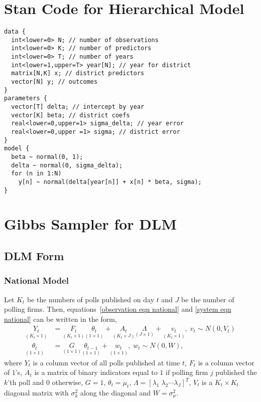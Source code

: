 \documentclass[12pt,final,fleqn]{article}
\theoremstyle{plain}
\begin{document}
\begin{appendices}
\section{Stan Code for Hierarchical Model} \label{Stan}
\begin{verbatim}
data {
  int<lower=0> N; // number of observations
  int<lower=0> K; // number of predictors
  int<lower=0> T; // number of years
  int<lower=1,upper=T> year[N]; // year for district
  matrix[N,K] x; // district predictors
  vector[N] y; // outcomes
} 
parameters {
  vector[T] delta; // intercept by year
  vector[K] beta; // district coefs
  real<lower=0,upper=1> sigma_delta; // year error
  real<lower=0,upper =1> sigma; // district error
} 
model {
  beta ~ normal(0, 1);
  delta ~ normal(0, sigma_delta);
  for (n in 1:N)
    y[n] ~ normal(delta[year[n]] + x[n] * beta, sigma);
}
\end{verbatim}

\section{Gibbs Sampler for DLM} \label{Gibbs}
\subsection{DLM Form} \label{sec: DLM Form}
\subsubsection{National Model} 
Let $K_t$ be the numbers of polls published on day $t$ and $J$ be the number of polling firms. Then, equations~\ref{observation eqn national} and \ref{system eqn national} can be written in the form,
\begin{align}
\label{eqn: dlm observation}
\underset{(K_t \times 1)}{Y_t} &= \underset{(K_t \times 1)}{F_t} \underset{(1 \times 1)}{\theta_t} + \underset{(K_t \times J)}{A_t} \underset{(J \times 1)}{\Lambda} + \underset{(K_t \times 1)}{v_t},\; v_t \sim N(0, V_t)\\
\label{eqn: dlm state}
\underset{(1 \times 1)}{\theta_t} &= \underset{(1 \times 1)}{G}\underset{(1 \times 1)}{\theta_{t-1}} + \underset{(1 \times 1)}{w_t},\; w_t \sim N(0, W),
\end{align}
where $Y_t$ is a column vector of all polls published at time $t$, $F_t$ is a column vector of $1$'s, $A_t$ is a matrix of binary indicators equal to $1$ if polling firm $j$ published the $k$'th poll and $0$ otherwise, $G=1$, $\theta_t = \mu_t$, $\Lambda =[\lambda_1\; \lambda_2\cdots \lambda_J]^T$,  $V_t$ is a $K_t \times K_t$ diagonal matrix with $\sigma^2_k$ along the diagonal and $W=\sigma^2_\mu$.


\end{appendices}
\end{document}
